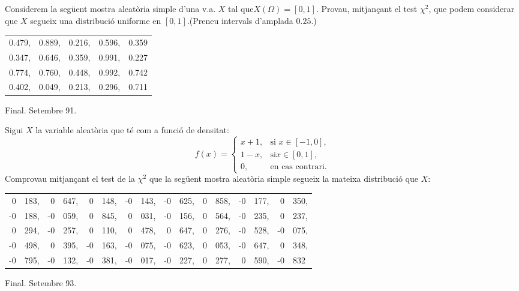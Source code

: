 \begin{prob}
{Considerem la seg\"uent mostra
aleat\`oria simple d'una v.a. $X$ tal que\break $X(\Omega)=[0,1]$.
Provau, mitjan\c{c}ant el test $\chi^2$, que podem considerar que
$X$ segueix una distribuci\'o uniforme en $[0,1]$.(Preneu intervals
d'amplada $0.25$.)
\begin{center}
\begin{tabular}{ccccc}
 0.479, & 0.889, & 0.216, & 0.596, & 0.359\\
 0.347, & 0.646, & 0.359, & 0.991, & 0.227\\
 0.774, & 0.760, & 0.448, & 0.992, & 0.742\\
 0.402, & 0.049, & 0.213, & 0.296, & 0.711\\
 \end{tabular}
 \end{center}

{\footnotesize Final. Setembre 91.}}
\end{prob} 

\begin{prob}
{Sigui $X$ la variable aleat\`oria que t\'e
com a funci\'o de densitat: $$f(x)=
\left\{\begin{array}{ll}
x+1, & \text{si $x\in [-1,0],$}\\ 1-x, & \text{si
$x\in [0,1],$}\\
0, & \text{en cas contrari.} 
\end{array}\right.
$$
Comprovau mitjan\c{c}ant el test de la
$\chi^2$ que la seg\"uent mostra aleat\`oria simple 
segueix la mateixa distribuci\'o que $X$:
\begin{center}
\begin{tabular}{r@{.}lr@{.}lr@{.}lr@{.}lr@{.}lr@{.}lr@{.}lr@{.}l} 
0&183,&0&647,&0&148,&-0&143,&-0&625,&0&858,&-0&177,&0&350,\\-0&188,&-0&059,&
0&845,&0&031,&-0&156,&0&564,&-0&235,&0&237,\\0&294,&-0&257,&0&110,&0&478,&
0&647,&0&276,&-0&528,&-0&075,\\-0&498,&0&395,&-0&163,&-0&075,&-0&623,&0&053,&
-0&647,&0&348,\\-0&795,&-0&132,&-0&381,&-0&017,&-0&227,&0&277,&0&590,&-0&832\\
\end{tabular}
\end{center}
{\footnotesize Final. Setembre 93.}} 
\end{prob}

